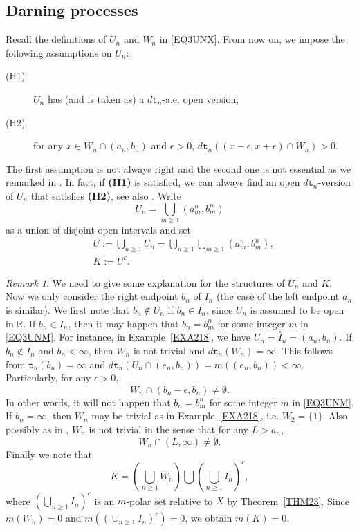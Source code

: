 \documentclass[a4paper]{amsart}
\theoremstyle{definition}
\theoremstyle{remark}
\newtheorem{remark}[theorem]{Remark}
\numberwithin{equation}{section}
\begin{document}
\subsection{Darning processes}\label{SEC42}

{
Recall the definitions of $U_n$ and $W_n$ in \eqref{EQ3UNX}. From now on, we impose the following assumptions on $U_n$:
\begin{description}
\item[(H1)] $U_n$ has (and is taken as) a $d{{\mathtt{t}}}_n$-a.e. open version;
\item[(H2)] for any $x\in W_n\cap (a_n,b_n)$ and $\epsilon>0$, $d{{\mathtt{t}}}_n\left( (x-\epsilon, x+\epsilon)\cap W_n\right)>0$.
\end{description}
The first assumption is not always right and the second one is not essential as we remarked in \cite[\S1]{LY14}. In fact, if \textbf{(H1)} is satisfied, we can always find an open $d{{\mathtt{t}}}_n$-version of $U_n$ that satisfies \textbf{(H2)}, see also \cite[\S1]{LY14}.
Write
\begin{equation}\label{EQ3UNM}
U_n=\bigcup_{m\geq 1}(a_m^n, b_m^n)
\end{equation}
as a union of disjoint open intervals and set
\[
\begin{aligned}
	&U:=\bigcup_{n\geq 1}U_n= \bigcup_{n\geq 1}\bigcup_{m\geq 1}(a^n_m,b^n_m),\\
	&K:=U^c.
\end{aligned}\]

\begin{remark}\label{RM34}
We need to give some explanation for the structures of $U_n$ and $K$.  Now we only consider the right endpoint $b_n$ of $I_n$ (the case of the left endpoint $a_n$ is similar).  We first note that  $b_n\notin U_n$ if  $b_n\in I_n$, since $U_n$ is assumed to be open in $\mathbb{R}$. If $b_n\in I_n$, then it may happen that $b_n=b^n_m$ for some integer $m$ in \eqref{EQ3UNM}. For instance, in Example~\ref{EXA218}, we have $U_n=\overset{\circ}{I}_n=(a_n,b_n)$. If $b_n\notin I_n$ and $b_n<\infty$, then $W_n$ is not trivial and $d{{\mathtt{t}}}_n(W_n)=\infty$. This follows from ${{\mathtt{t}}}_n(b_n)=\infty$ and $d{{\mathtt{t}}}_n\left(U_n\cap (e_n,b_n)\right)=m((e_n,b_n))<\infty$. Particularly, for any $\epsilon>0$,
\[
	W_n\cap (b_n-\epsilon, b_n)\neq \emptyset.
\]
In other words, it will not happen that $b_n=b_m^n$ for some integer $m$ in \eqref{EQ3UNM}. If $b_n=\infty$, then $W_n$ may be trivial as in Example~\ref{EXA218}, i.e. $W_2=\{1\}$. Also possibly as in \cite[Remark~3.2]{LY14}, $W_n$ is not trivial in the sense that for any $L>a_n$,
\[
	W_n\cap (L, \infty)\neq \emptyset.
\]
Finally we note that
\[
K=\left(\bigcup_{n\geq 1}{W_n}\right) \bigcup \left( \bigcup_{n\geq 1} I_n\right)^c,
\]
where $\left(\bigcup_{n\geq 1}I_n\right)^c$ is an $m$-polar set relative to $X$ by Theorem~\ref{THM23}. Since $m(W_n)=0$ and $m\left(\left(\cup_{n\geq 1}I_n\right)^c\right)=0$, we obtain $m(K)=0$.
\end{remark}
}
\end{document}
